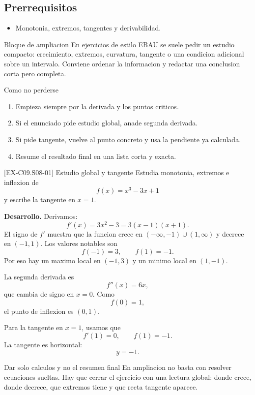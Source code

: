 \subsection*{Prerrequisitos}
\begin{itemize}
  \item Monotonia, extremos, tangentes y derivabilidad.
\end{itemize}

\begin{theorybox}{Bloque de ampliacion}
En ejercicios de estilo EBAU se suele pedir un estudio compacto: crecimiento, extremos,
curvatura, tangente o una condicion adicional sobre un intervalo. Conviene ordenar la
informacion y redactar una conclusion corta pero completa.
\end{theorybox}

\begin{methodbox}{Como no perderse}
\begin{enumerate}
  \item Empieza siempre por la derivada y los puntos criticos.
  \item Si el enunciado pide estudio global, anade segunda derivada.
  \item Si pide tangente, vuelve al punto concreto y usa la pendiente ya calculada.
  \item Resume el resultado final en una lista corta y exacta.
\end{enumerate}
\end{methodbox}

\begin{solvedexample}{[EX-C09.S08-01] Estudio global y tangente}
Estudia monotonia, extremos e inflexion de
\[
f(x)=x^3-3x+1
\]
y escribe la tangente en \(x=1\).

\textbf{Desarrollo.} Derivamos:
\[
f'(x)=3x^2-3=3(x-1)(x+1).
\]
El signo de \(f'\) muestra que la funcion crece en \((-\infty,-1)\cup(1,\infty)\) y decrece
en \((-1,1)\). Los valores notables son
\[
f(-1)=3,\qquad f(1)=-1.
\]
Por eso hay un maximo local en \((-1,3)\) y un minimo local en \((1,-1)\).

La segunda derivada es
\[
f''(x)=6x,
\]
que cambia de signo en \(x=0\). Como
\[
f(0)=1,
\]
el punto de inflexion es \((0,1)\).

Para la tangente en \(x=1\), usamos que
\[
f'(1)=0,\qquad f(1)=-1.
\]
La tangente es horizontal:
\[
y=-1.
\]
\end{solvedexample}

\begin{commonerror}{Dar solo calculos y no el resumen final}
En ampliacion no basta con resolver ecuaciones sueltas. Hay que cerrar el ejercicio con una
lectura global: donde crece, donde decrece, que extremos tiene y que recta tangente aparece.
\end{commonerror}

